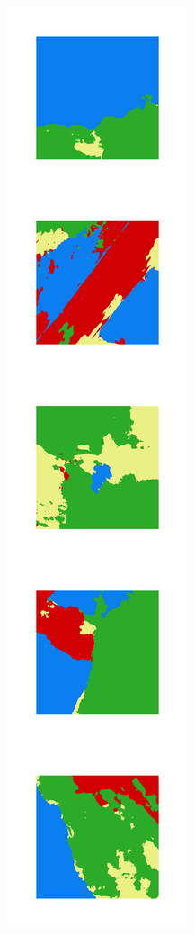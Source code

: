 \begin{figure}[h]
\begin{subfigure}{\UnetPredictionsImageWidth}
        \caption{}
        \label{fig:unet_pred_23}
    \end{subfigure} \hspace{2mm}
    \begin{subfigure}{\UnetPredictionsImageWidth}
        \includegraphics[width=\textwidth]{images/unet/unet-23D}
        \caption{}
        \label{fig:unet_pred_23d}
    \end{subfigure}


\end{figure}
